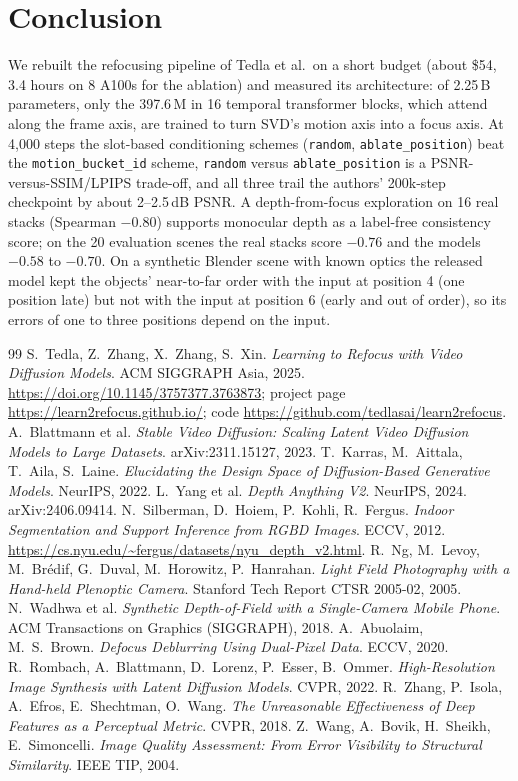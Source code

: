 \documentclass[11pt]{article}
\begin{document}
\section{Conclusion}
We rebuilt the refocusing pipeline of Tedla et al.\ on a short budget (about \$54, 3.4 hours on 8 A100s for the ablation) and measured its architecture: of 2.25\,B parameters, only the 397.6\,M in 16 temporal transformer blocks, which attend along the frame axis, are trained to turn SVD's motion axis into a focus axis.
At 4{,}000 steps the slot-based conditioning schemes (\texttt{random}, \texttt{ablate\_position}) beat the \texttt{motion\_bucket\_id} scheme, \texttt{random} versus \texttt{ablate\_position} is a PSNR-versus-SSIM/LPIPS trade-off, and all three trail the authors' 200k-step checkpoint by about 2--2.5\,dB PSNR.
A depth-from-focus exploration on 16 real stacks (Spearman $-0.80$) supports monocular depth as a label-free consistency score; on the 20 evaluation scenes the real stacks score $-0.76$ and the models $-0.58$ to $-0.70$.
On a synthetic Blender scene with known optics the released model kept the objects' near-to-far order with the input at position 4 (one position late) but not with the input at position 6 (early and out of order), so its errors of one to three positions depend on the input.

\begin{thebibliography}{99}
 S.~Tedla, Z.~Zhang, X.~Zhang, S.~Xin. \emph{Learning to Refocus with Video Diffusion Models}. ACM SIGGRAPH Asia, 2025. \url{https://doi.org/10.1145/3757377.3763873};
  project page \url{https://learn2refocus.github.io/}; code \url{https://github.com/tedlasai/learn2refocus}.
 A.~Blattmann et al. \emph{Stable Video Diffusion: Scaling Latent Video Diffusion Models to Large Datasets}. arXiv:2311.15127, 2023.
 T.~Karras, M.~Aittala, T.~Aila, S.~Laine. \emph{Elucidating the Design Space of Diffusion-Based Generative Models}. NeurIPS, 2022.
 L.~Yang et al. \emph{Depth Anything V2}. NeurIPS, 2024. arXiv:2406.09414.
 N.~Silberman, D.~Hoiem, P.~Kohli, R.~Fergus. \emph{Indoor Segmentation and Support Inference from RGBD Images}. ECCV, 2012. \url{https://cs.nyu.edu/~fergus/datasets/nyu_depth_v2.html}.
 R.~Ng, M.~Levoy, M.~Br\'edif, G.~Duval, M.~Horowitz, P.~Hanrahan. \emph{Light Field Photography with a Hand-held Plenoptic Camera}. Stanford Tech Report CTSR 2005-02, 2005.
 N.~Wadhwa et al. \emph{Synthetic Depth-of-Field with a Single-Camera Mobile Phone}. ACM Transactions on Graphics (SIGGRAPH), 2018.
 A.~Abuolaim, M.~S.~Brown. \emph{Defocus Deblurring Using Dual-Pixel Data}. ECCV, 2020.
 R.~Rombach, A.~Blattmann, D.~Lorenz, P.~Esser, B.~Ommer. \emph{High-Resolution Image Synthesis with Latent Diffusion Models}. CVPR, 2022.
 R.~Zhang, P.~Isola, A.~Efros, E.~Shechtman, O.~Wang. \emph{The Unreasonable Effectiveness of Deep Features as a Perceptual Metric}. CVPR, 2018.
 Z.~Wang, A.~Bovik, H.~Sheikh, E.~Simoncelli. \emph{Image Quality Assessment: From Error Visibility to Structural Similarity}. IEEE TIP, 2004.
\end{thebibliography}
\end{document}
